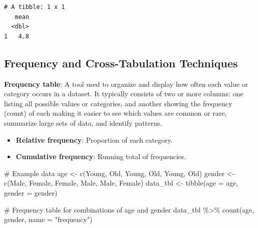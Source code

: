 \documentclass[
  man,
  floatsintext,
  longtable,
  nolmodern,
  notxfonts,
  notimes,
  colorlinks=true,linkcolor=blue,citecolor=blue,urlcolor=blue]{apa7}
\newenvironment{Shaded}{\begin{snugshade}}{\end{snugshade}}
\newcommand{\AttributeTok}[1]{\textcolor[rgb]{0.40,0.45,0.13}{#1}}
\newcommand{\CommentTok}[1]{\textcolor[rgb]{0.37,0.37,0.37}{#1}}
\newcommand{\FunctionTok}[1]{\textcolor[rgb]{0.28,0.35,0.67}{#1}}
\newcommand{\NormalTok}[1]{\textcolor[rgb]{0.00,0.23,0.31}{#1}}
\newcommand{\OtherTok}[1]{\textcolor[rgb]{0.00,0.23,0.31}{#1}}
\newcommand{\SpecialCharTok}[1]{\textcolor[rgb]{0.37,0.37,0.37}{#1}}
\newcommand{\StringTok}[1]{\textcolor[rgb]{0.13,0.47,0.30}{#1}}
\providecommand{\tightlist}{%
  \setlength{\itemsep}{0pt}\setlength{\parskip}{0pt}}
\begin{document}
\begin{verbatim}
# A tibble: 1 x 1
   mean
  <dbl>
1   4.8
\end{verbatim}

\subsection{Frequency and Cross-Tabulation
Techniques}\label{frequency-and-cross-tabulation-techniques}

\textbf{Frequency table}: A tool used to organize and display how often
each value or category occurs in a dataset. It typically consists of two
or more columns: one listing all possible values or categories, and
another showing the frequency (count) of each making it easier to see
which values are common or rare, summarize large sets of data, and
identify patterns.

\begin{itemize}
\tightlist
\item
  \textbf{Relative frequency}: Proportion of each category.
\item
  \textbf{Cumulative frequency}: Running total of frequencies.
\end{itemize}

\begin{Shaded}
\begin{Highlighting}[]
\CommentTok{\# Example data}
\NormalTok{age }\OtherTok{\textless{}{-}} \FunctionTok{c}\NormalTok{(}\StringTok{\textquotesingle{}Young\textquotesingle{}}\NormalTok{, }\StringTok{\textquotesingle{}Old\textquotesingle{}}\NormalTok{, }\StringTok{\textquotesingle{}Young\textquotesingle{}}\NormalTok{, }\StringTok{\textquotesingle{}Old\textquotesingle{}}\NormalTok{, }\StringTok{\textquotesingle{}Young\textquotesingle{}}\NormalTok{, }\StringTok{\textquotesingle{}Old\textquotesingle{}}\NormalTok{)}
\NormalTok{gender }\OtherTok{\textless{}{-}} \FunctionTok{c}\NormalTok{(}\StringTok{\textquotesingle{}Male\textquotesingle{}}\NormalTok{, }\StringTok{\textquotesingle{}Female\textquotesingle{}}\NormalTok{, }\StringTok{\textquotesingle{}Female\textquotesingle{}}\NormalTok{, }\StringTok{\textquotesingle{}Male\textquotesingle{}}\NormalTok{, }\StringTok{\textquotesingle{}Male\textquotesingle{}}\NormalTok{, }\StringTok{\textquotesingle{}Female\textquotesingle{}}\NormalTok{)}
\NormalTok{data\_tbl }\OtherTok{\textless{}{-}} \FunctionTok{tibble}\NormalTok{(}\AttributeTok{age =}\NormalTok{ age, }\AttributeTok{gender =}\NormalTok{ gender)}

\CommentTok{\# Frequency table for combinations of age and gender}
\NormalTok{data\_tbl }\SpecialCharTok{\%\textgreater{}\%}
  \FunctionTok{count}\NormalTok{(age, gender, }\AttributeTok{name =} \StringTok{"frequency"}\NormalTok{)}
\end{Highlighting}
\end{Shaded}
\end{document}
